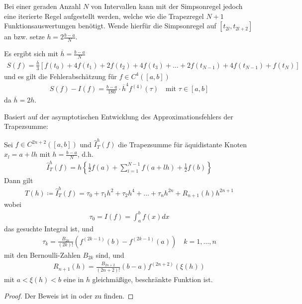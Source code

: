 Bei einer geraden Anzahl $N$ von Intervallen kann mit der
Simpsonregel jedoch eine iterierte Regel aufgestellt werden,
welche wie die Trapezregel $N+1$ Funktionsauswertungen benötigt.
Wende hierfür die Simpsonregel auf $[t_{2l}, t_{2l+2}]$ an
bzw. setze $h=2\frac{b-a}{N}$.

Es ergibt sich mit $\overline{h}= \frac{b-a}{N}$
\begin{gather}
  S(f) = \frac{\overline{h}}{3}\left[
    f(t_0)+4f(t_1) + 2f(t_2) + 4f(t_3) +
    \ldots + 2f(t_{N-1}) + 4f(t_{N-1}) + f(t_N)
  \right]
  \label{VII.2.16}
\end{gather}
und es gilt die Fehlerabschätzung für $f\in C^4([a,b])$
\begin{gather}
  S(f)-I(f)=
  \frac{b-a}{180}\cdot\overline{h}^4f^{(4)}(\tau)
  \quad \text{mit } \tau \in[a,b]
  \label{VII.2.17}
\end{gather}
da $\overline{h}= 2h$.


Basiert auf der asymptotischen
Entwicklung
des Approximationsfehlers der
Trapezsumme:

\begin{Satze}
  Sei $f\in C^{2n+2}([a,b])$ und 
  $\hat{I}_T^h(f)$ die Trapezsumme
  für äquidistante Knoten $x_l=a+lh$
  mit $h=\frac{b-a}{N}$, d.h.
  \begin{gather}
    \hat{I}_T^h(f) = h\left\{
      \frac{1}{2}f(a) + \sum_{i=1}^{N-1}f(a+lh) +
      \frac{1}{2}f(b)
    \right\}
    \label{VII.3.1}
  \end{gather}
  Dann gilt
  \begin{gather}
    T(h) \coloneqq \hat{I}_T^h(f) = \tau_0+\tau_1h^2+\tau_2h^4
    +\ldots + \tau_nh^{2n}+ R_{n+1}(h)h^{2n+1}
  \end{gather}
  wobei
  \begin{gather}
    \tau_0 = I(f) = \int_a^bf(x)dx
    \label{VII.3.3}
  \end{gather}
  das gesuchte Integral ist, und
  \begin{gather*}
    \tau_k = \frac{B_{2k}}{(2k)!}
    \left(f^{(2k-1)}(b)-f^{(2k-1)}(a)\right)
    \quad k=1,\ldots, n
  \end{gather*}
  mit den Bernoulli-Zahlen $B_{2k}$ sind, und
  \begin{gather*}
    R_{n+1}(h) =
    \frac{B_{2n+2}}{(2n+2)!}(b-a)f^{(2n+2)}(\xi(h))
  \end{gather*}
  mit $a<\xi(h)<b$ eine in $h$
  gleichmäßige, beschränkte Funktion
  ist.

  \begin{proof}
    Der Beweis ist in
    \cite{stoerbulirsch} 
    oder \cite{haemmerlinhoffmann} zu finden.
  \end{proof}
\end{Satze}

